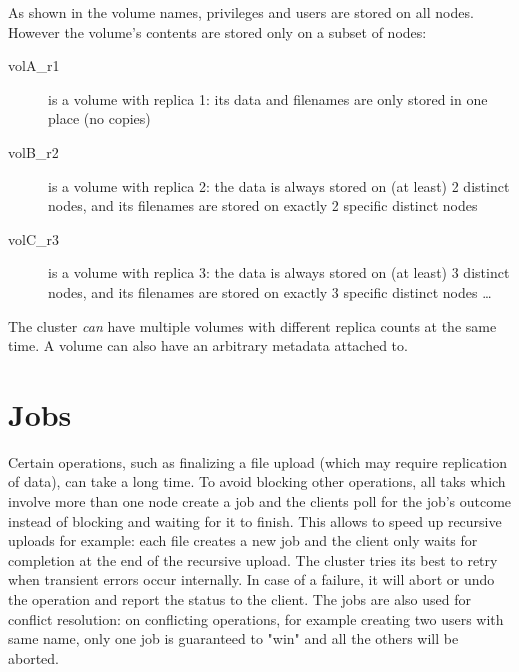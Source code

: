 As shown in  the volume names, privileges and users are
stored on all nodes. However the volume's contents are stored only on a subset
of nodes:
\begin{description}
	\item[volA\_r1] is a volume with replica 1: its data and filenames
	are only stored in one place (no copies)
	\item[volB\_r2] is a volume with replica 2: the data is always stored
	on (at least) 2 distinct nodes, and its filenames are stored on exactly
	2 specific distinct nodes
	\item[volC\_r3] is a volume with replica 3: the data is always stored
	on (at least) 3 distinct nodes, and its filenames are stored on exactly
	3 specific distinct nodes
	 \ldots
\end{description}
The cluster \emph{can} have multiple volumes with different replica counts at
the same time. A volume can also have an arbitrary metadata attached to.


\section{Jobs}
Certain operations, such as finalizing a file upload (which may require
replication of data), can take a long time. To avoid blocking other operations,
all taks which involve more than one node create a job and the \SX clients poll
for the job's outcome instead of blocking and waiting for it to finish. This
allows to speed up recursive uploads for example: each file creates a new job
and the client only waits for completion at the end of the recursive upload.
The cluster tries its best to retry when transient errors occur internally.
In case of a failure, it will abort or undo the operation and report the status
to the client. The jobs are also used for conflict resolution: on conflicting
operations, for example creating two users with same name, only one job is
guaranteed to "win" and all the others will be aborted.
